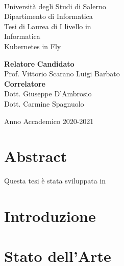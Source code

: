 \documentclass[11pt,oneside]{book}
\begin{document}

\begin{titlepage}
\begin{center}
\\[0.2truecm]
{\Large Universit\`a degli Studi di Salerno}\\[0.2truecm]
{\large Dipartimento di Informatica}\\
\hrulefill
\vfill
{\large Tesi di Laurea di I livello in }\\[0.2truecm]
{\Large Informatica}\\
\vfill\vfill
{\Huge Kubernetes in Fly}
\vfill\vfill


{\bf Relatore} \hfill {\bf Candidato}\ \ \\
Prof. Vittorio Scarano \hfill Luigi Barbato\\
{\bf Correlatore} \hfill {\bf }\ \ \\
Dott. Giuseppe D'Ambrosio \hfill \ \ \\
Dott. Carmine Spagnuolo \hfill \ \ \\

\vfill
\hrulefill 

Anno Accademico 2020-2021

\end{center}
\end{titlepage}

\chapter*{Abstract}


\vfill
\centerline{\Large\sf Questa tesi è stata sviluppata in  }

\tableofcontents
\pagestyle{plain}

\chapter{Introduzione}
\setcounter{page}{1} 	%

 
\chapter{Stato dell'Arte}

\end{document}
